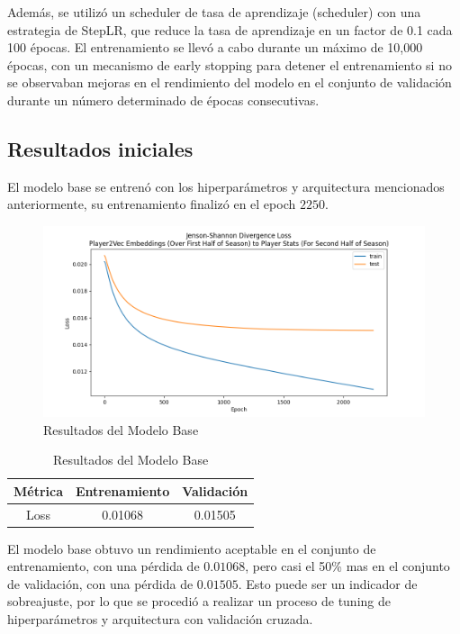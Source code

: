 \documentclass[
  a4paper,
]{article}
\begin{document}
Además, se utilizó un scheduler de tasa de aprendizaje (scheduler) con
una estrategia de StepLR, que reduce la tasa de aprendizaje en un factor
de 0.1 cada 100 épocas. El entrenamiento se llevó a cabo durante un
máximo de 10,000 épocas, con un mecanismo de early stopping para detener
el entrenamiento si no se observaban mejoras en el rendimiento del
modelo en el conjunto de validación durante un número determinado de
épocas consecutivas.

\hypertarget{resultados-iniciales}{%
\subsection{Resultados iniciales}\label{resultados-iniciales}}

El modelo base se entrenó con los hiperparámetros y arquitectura
mencionados anteriormente, su entrenamiento finalizó en el epoch
\(2250\).

\begin{figure}
\centering
\includegraphics{recursos_pdf/graficos/p2v_dist_model_oos_190_for_graph_190_for_model_64_10000_0.005_StepLR.png}
\caption{Resultados del Modelo Base}
\end{figure}

\begin{table}
\caption{Resultados del Modelo Base}
\begin{tabular}{|c|c|c|}
\hline
\textbf{Métrica} & \textbf{Entrenamiento} & \textbf{Validación} \\
\hline
Loss & 0.01068 & 0.01505 \\
\hline
\end{tabular}
\end{table}

El modelo base obtuvo un rendimiento aceptable en el conjunto de
entrenamiento, con una pérdida de \(0.01068\), pero casi el 50\% mas en
el conjunto de validación, con una pérdida de \(0.01505\). Esto puede
ser un indicador de sobreajuste, por lo que se procedió a realizar un
proceso de tuning de hiperparámetros y arquitectura con validación
cruzada.
\end{document}
